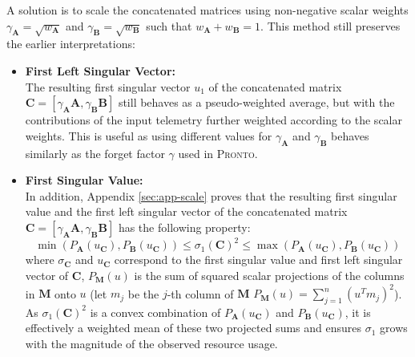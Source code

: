 A solution is to scale the concatenated matrices using non-negative scalar
weights $\gamma_{\mathbf{A}} = \sqrt{w_{\mathbf{A}}}$ and
$\gamma_{\mathbf{\mathbf{B}}} = \sqrt{w_{\mathbf{\mathbf{B}}}}$ such that
$w_{\mathbf{A}} + w_{\mathbf{\mathbf{B}}} = 1$. This method still preserves the
earlier interpretations:

\begin{itemize}
    \item \textbf{First Left Singular Vector:}\\
        The resulting first singular vector $u_1$ of the concatenated matrix $\mathbf{C} =
        [\gamma_{\mathbf{A}}\mathbf{A},
        \gamma_{\mathbf{\mathbf{B}}}\mathbf{\mathbf{B}}]$ still behaves as a
        pseudo-weighted average, but with the contributions of the input telemetry
        further weighted according to the scalar weights. This is useful as using
        different values for $\gamma_{\mathbf{A}}$ and $\gamma_{\mathbf{B}}$ behaves
        similarly as the forget factor $\gamma$ used in \textsc{Pronto}.
    \item \textbf{First Singular Value:}\\
        In addition, Appendix \ref{sec:app-scale} proves that the resulting first
        singular value and the first left singular vector of the concatenated matrix
        $\mathbf{C} = [\gamma_{\mathbf{A}}\mathbf{A},
        \gamma_{\mathbf{B}}\mathbf{B}]$ has the following property:
        \[ \min(P_{\mathbf{A}}(u_{\mathbf{C}}),P_{\mathbf{B}}(u_{\mathbf{C}}))
        \leq \sigma_1(\mathbf{C})^2 \leq
        \max(P_{\mathbf{A}}(u_{\mathbf{C}}),P_{\mathbf{B}}(u_{\mathbf{C}})) \]
        where $\sigma_{\mathbf{C}}$ and $u_{\mathbf{C}}$ correspond to the first
        singular value and first left singular vector of $\mathbf{C}$,
        $P_{\mathbf{M}}(u)$ is the sum of squared scalar projections of the
        columns in $\mathbf{M}$ onto $u$ (let $m_j$ be the $j$-th column of
        $\mathbf{M}$ $P_{\mathbf{M}}(u) = \sum_{j=1}^n (u^T m_j)^2$). As
        $\sigma_1(\mathbf{C})^2$ is a convex combination of
        $P_{\mathbf{A}}(u_{\mathbf{C}})$ and $P_{\mathbf{B}}(u_{\mathbf{C}})$,
        it is effectively a weighted mean of these two projected sums and
        ensures $\sigma_1$ grows with the magnitude of the observed resource
        usage.
\end{itemize}

